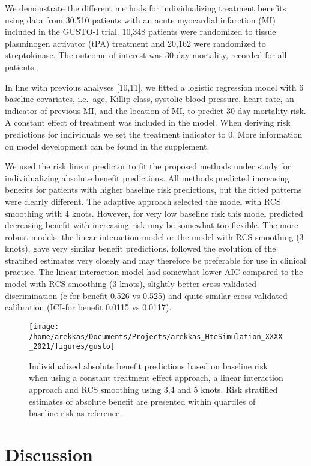 \documentclass{article}
\begin{document}
We demonstrate the different methods for individualizing treatment
benefits using data from 30,510 patients with an acute myocardial
infarction (MI) included in the GUSTO-I trial. 10,348 patients were
randomized to tissue plasminogen activator (tPA) treatment and 20,162
were randomized to streptokinase. The outcome of interest was 30-day
mortality, recorded for all patients.

In line with previous analyses {[}10,11{]}, we fitted a logistic
regression model with 6 baseline covariates, i.e.~age, Killip class,
systolic blood pressure, heart rate, an indicator of previous MI, and
the location of MI, to predict 30-day mortality risk. A constant effect
of treatment was included in the model. When deriving risk predictions
for individuals we set the treatment indicator to 0. More information on
model development can be found in the supplement.

We used the risk linear predictor to fit the proposed methods under
study for individualizing absolute benefit predictions. All methods
predicted increasing benefits for patients with higher baseline risk
predictions, but the fitted patterns were clearly different. The
adaptive approach selected the model with RCS smoothing with 4 knots.
However, for very low baseline risk this model predicted decreasing
benefit with increasing risk may be somewhat too flexible. The more
robust models, the linear interaction model or the model with RCS
smoothing (3 knots), gave very similar benefit predictions, followed the
evolution of the stratified estimates very closely and may therefore be
preferable for use in clinical practice. The linear interaction model
had somewhat lower AIC compared to the model with RCS smoothing (3
knots), slightly better cross-validated discrimination (c-for-benefit
0.526 vs 0.525) and quite similar cross-validated calibration (ICI-for
benefit 0.0115 vs 0.0117).

\begin{figure}
\texttt{[image: /home/arekkas/Documents/Projects/arekkas\_HteSimulation\_XXXX\_2021/figures/gusto]} \caption{Individualized absolute benefit predictions based on baseline risk when using a constant treatment effect approach, a linear interaction approach and RCS smoothing using 3,4 and 5 knots. Risk stratified estimates of absolute benefit are presented within quartiles of baseline risk as reference.}\label{fig:gusto}
\end{figure}

\hypertarget{discussion}{%
\section{Discussion}\label{discussion}}
\end{document}
